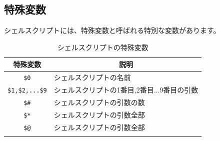 \documentclass[a4j]{ltjreport}
\begin{document}



    \subsection{特殊変数}
    シェルスクリプトには、特殊変数と呼ばれる特別な変数があります。
    \begin{longtable}[c]{|c|l|}
        \hline
        \multicolumn{1}{|c|}{\textbf{特殊変数}}&\multicolumn{1}{|c|}{\textbf{説明}}\\
        \hline\hline
        \texttt{\$0} & シェルスクリプトの名前 \\
        \hline
        \texttt{\$1,\$2,...\$9} & シェルスクリプトの1番目,2番目...9番目の引数 \\
        \hline
        \texttt{\$\#} & シェルスクリプトの引数の数 \\
        \hline
        \texttt{\$*} & シェルスクリプトの引数全部 \\
        \hline
        \texttt{\$@} & シェルスクリプトの引数全部 \\
        \hline
        \caption{シェルスクリプトの特殊変数}
    \end{longtable}
\end{document}
